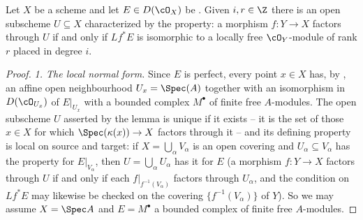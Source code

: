 \begin{lemma}
\label{lem:pc-perfect-locus}
Let $X$ be a scheme and let $E\in D(\cO_X)$ be
.  Given $i,r\in\Z$ there is
an open subscheme $U\subseteq X$ characterized by the property: a
morphism $f:Y\to X$ factors through $U$ if and only if $Lf^*E$ is
isomorphic to a locally free $\cO_Y$-module of rank $r$ placed in
degree $i$.
\end{lemma}
\begin{proof}
\emph{1. The local normal form.}  Since $E$ is perfect, every point
$x\in X$ has, by , an affine
open neighbourhood $U_x=\Spec(A)$ together with an isomorphism in
$D(\cO_{U_x})$ of $E|_{U_x}$ with a bounded complex $M^{\bullet}$ of
finite free $A$-modules.  The open subscheme $U$ asserted by the lemma
is unique if it exists -- it is the set of those $x\in X$ for which
$\Spec(\kappa(x))\to X$ factors through it -- and its defining
property is local on source and target: if $X=\bigcup_\alpha V_\alpha$
is an open covering and $U_\alpha\subseteq V_\alpha$ has the property
for $E|_{V_\alpha}$, then $U=\bigcup_\alpha U_\alpha$ has it for $E$
(a morphism $f:Y\to X$ factors through $U$ if and only if each
$f|_{f^{-1}(V_\alpha)}$ factors through $U_\alpha$, and the condition
on $Lf^*E$ may likewise be checked on the covering
$\{f^{-1}(V_\alpha)\}$ of $Y$).  So we may assume $X=\Spec A$ and
$E=M^{\bullet}$ a bounded complex of finite free $A$-modules.


\end{proof}
